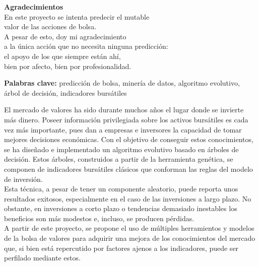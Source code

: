 \vskip 4cm

\textbf{Agradecimientos}\\

\noindent En este proyecto se intenta predecir el mutable\\
valor de las acciones de bolsa.\\
A pesar de esto, doy mi agradecimiento\\
a la única acci\'on que no necesita ninguna predicci\'on:\\
el apoyo de los que siempre est\'an ah\'i,\\
bien por afecto, bien por profesionalidad.

\newpage

\begin{resumen}
	\noindent\textbf{Palabras clave:} predicci\'on de bolsa, miner\'ia de datos, algoritmo evolutivo, \'arbol de decisi\'on, indicadores burs\'atiles
	\vspace{1cm}	
		
	El mercado de valores ha sido durante muchos años el lugar donde se invierte más dinero. Poseer informaci\'on privilegiada sobre los activos burs\'atiles es cada vez m\'as importante, pues dan a empresas e inversores la capacidad de tomar mejores decisiones econ\'omicas. Con el objetivo de conseguir estos conocimientos, se ha dise\~nado e implementado un algoritmo evolutivo basado en \'arboles de decisi\'on. Estos \'arboles, construidos a partir de la herramienta gen\'etica, se componen de indicadores burs\'atiles cl\'asicos que conforman las reglas del modelo de inversi\'on.\\
	
	Esta t\'ecnica, a pesar de tener un componente aleatorio, puede reporta unos resultados exitosos, especialmente en el caso de las inversiones a largo plazo. No obstante, en inversiones a corto plazo o tendencias demasiado inestables los beneficios son m\'as modestos e, incluso, se producen p\'erdidas.\\
	
	A partir de este proyecto, se propone el uso de m\'ultiples herramientos y modelos de la bolsa de valores para adquirir una mejora de los conocimientos del mercado que, si bien est\'a repercutido por factores ajenos a los indicadores, puede ser perfilado mediante estos.
\end{resumen}

